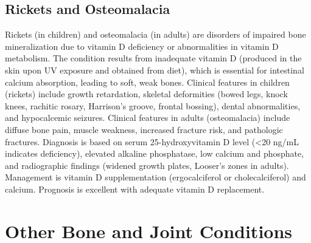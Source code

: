 \subsection{Rickets and Osteomalacia}
\label{sec:Rickets and Osteomalacia}
Rickets (in children) and osteomalacia (in adults) are disorders of impaired bone mineralization due to vitamin D deficiency or abnormalities in vitamin D metabolism. The condition results from inadequate vitamin D (produced in the skin upon UV exposure and obtained from diet), which is essential for intestinal calcium absorption, leading to soft, weak bones. Clinical features in children (rickets) include growth retardation, skeletal deformities (bowed legs, knock knees, rachitic rosary, Harrison's groove, frontal bossing), dental abnormalities, and hypocalcemic seizures. Clinical features in adults (osteomalacia) include diffuse bone pain, muscle weakness, increased fracture risk, and pathologic fractures. Diagnosis is based on serum 25-hydroxyvitamin D level (<20 ng/mL indicates deficiency), elevated alkaline phosphatase, low calcium and phosphate, and radiographic findings (widened growth plates, Looser's zones in adults). Management is vitamin D supplementation (ergocalciferol or cholecalciferol) and calcium. Prognosis is excellent with adequate vitamin D replacement.

\section{Other Bone and Joint Conditions}








\label{sec:Other Bone and Joint Conditions}

